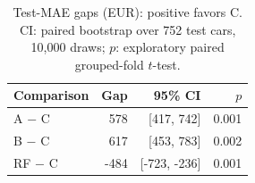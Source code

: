 \begin{table}[h!]
\centering\small\setlength{\tabcolsep}{3pt}
\begin{tabular}{lrrr}
\toprule
Comparison & Gap & 95\% CI & $p$\\
\midrule
A $-$ C & 578 & [417, 742] & 0.001\\
B $-$ C & 617 & [453, 783] & 0.002\\
RF $-$ C & -484 & [-723, -236] & 0.001\\
\bottomrule
\end{tabular}
\caption{Test-MAE gaps (EUR): positive favors C. CI: paired bootstrap over 752 test cars, 10,000 draws; $p$: exploratory paired grouped-fold $t$-test.}
\label{tab:gaps}
\end{table}
